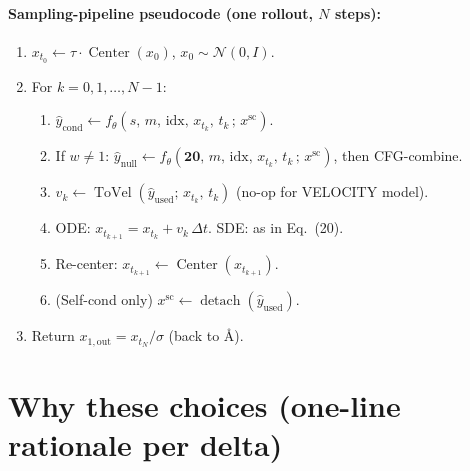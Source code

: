 \documentclass[11pt]{article}
\begin{document}
\paragraph{Sampling-pipeline pseudocode (one rollout, $N$ steps):}
\begin{enumerate}\itemsep -1pt
\item $x_{t_0} \leftarrow \tau \cdot \operatorname{Center}(x_0)$, $x_0 \sim \mathcal{N}(0, I)$.
\item For $k = 0, 1, \dots, N-1$:
  \begin{enumerate}
  \item $\hat{y}_\text{cond} \leftarrow f_\theta(s,\,m,\,\text{idx},\,x_{t_k},\,t_k\,;\,x^\text{sc})$.
  \item If $w \neq 1$: $\hat{y}_\text{null} \leftarrow f_\theta(\mathbf{20},\,m,\,\text{idx},\,x_{t_k},\,t_k\,;\,x^\text{sc})$, then CFG-combine.
  \item $v_k \leftarrow \operatorname{ToVel}(\hat{y}_\text{used};\,x_{t_k},\,t_k)$ (no-op for VELOCITY model).
  \item ODE: $x_{t_{k+1}} = x_{t_k} + v_k\,\Delta t$. \quad SDE: as in Eq.~(20).
  \item Re-center: $x_{t_{k+1}} \leftarrow \operatorname{Center}(x_{t_{k+1}})$.
  \item (Self-cond only) $x^{\text{sc}} \leftarrow \operatorname{detach}(\hat{y}_\text{used})$.
  \end{enumerate}
\item Return $x_{1,\text{out}} = x_{t_N} / \sigma$ (back to \AA).
\end{enumerate}

\section{Why these choices (one-line rationale per delta)}
\end{document}
